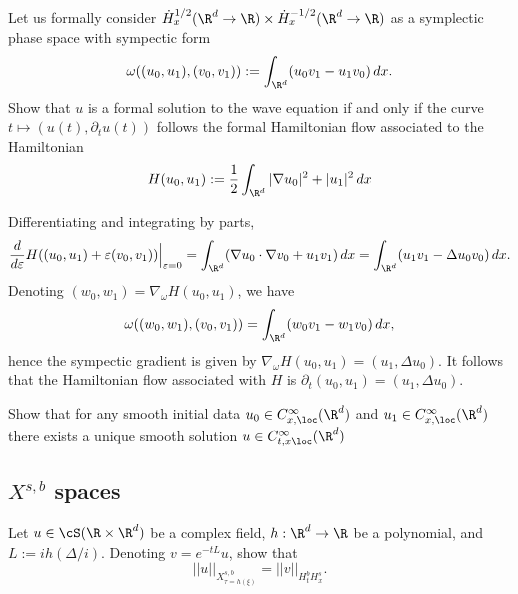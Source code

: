 \begin{statement}
	Let us formally consider $\dot H^{1/2}_x (\R^d \to \R) \times \dot H_x^{-1/2} (\R^d \to \R)$ as a symplectic phase space with sympectic form	
		\[ \omega ((u_0, u_1), (v_0, v_1)) := \int_{\R^d} (u_0 v_1 - u_1 v_0) \, dx. \]
	Show that $u$ is a formal solution to the wave equation if and only if the curve $t \mapsto (u(t), \partial_t u (t))$ follows the formal Hamiltonian flow associated to the Hamiltonian 
		\[ H(u_0, u_1) := \frac12 \int_{\R^d} |\nabla u_0|^2 + |u_1|^2 \, dx \]	
\end{statement}

\begin{solution}
	Differentiating and integrating by parts, 
		\[ \frac{d}{d\epsilon} H( (u_0, u_1) + \epsilon (v_0, v_1)) \Big|_{\epsilon = 0} = \int_{\R^d} (\nabla u_0 \cdot \nabla v_0 + u_1  v_1) \, dx = \int_{\R^d} (u_1 v_1 - \Delta u_0 v_0 ) \, dx. \]
	Denoting $(w_0, w_1) = \nabla_\omega H(u_0, u_1)$, we have
		\[ \omega((w_0, w_1), (v_0, v_1)) = \int_{\R^d} (w_0 v_1 - w_1 v_0) \, dx, \]
	hence the sympectic gradient is given by $\nabla_\omega H(u_0, u_1) = (u_1, \Delta u_0)$. It follows that the Hamiltonian flow associated with $H$ is $\partial_t (u_0, u_1) = (u_1, \Delta u_0)$. 
\end{solution}


\begin{statement}
	Show that for any smooth initial data $u_0 \in C^\infty_{x, \loc} (\R^d)$ and $u_1 \in C^\infty_{x ,\loc} (\R^d)$ there exists a unique smooth solution $u \in C^\infty_{t, x \loc} (\R^d)$
\end{statement}

\begin{solution}

\end{solution}



\subsection{$X^{s, b}$ spaces}

\begin{statement}
	Let $u \in \cS(\R \times \R^d)$ be a complex field, $h: \R^d \to \R$ be a polynomial, and $L := i h(\Delta/i)$. Denoting $v = e^{-t L} u$, show that
		\[ ||u||_{X^{s, b}_{\tau = h(\xi)}} = ||v||_{H^b_t H^s_x}. \]
\end{statement}

